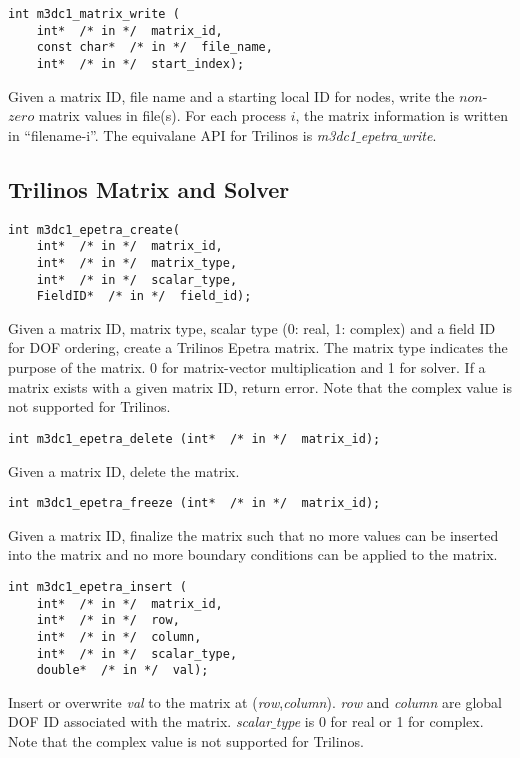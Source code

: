 \begin{verbatim}
int m3dc1_matrix_write (
    int*  /* in */  matrix_id, 
    const char*  /* in */  file_name, 
    int*  /* in */  start_index);
\end{verbatim}\vspace{-.5cm}\hspace{1cm}
Given a matrix ID, file name and a starting local ID for nodes, write the $non$-$zero$ matrix values in file(s). For each process $i$, the matrix information is written in ``filename-i''. The equivalane API for Trilinos is \textit{m3dc1$\_$epetra$\_$write}.

\subsection{Trilinos Matrix and Solver}
\begin{verbatim}
int m3dc1_epetra_create(
    int*  /* in */  matrix_id, 
    int*  /* in */  matrix_type, 
    int*  /* in */  scalar_type, 
    FieldID*  /* in */  field_id);
\end{verbatim}\vspace{-.5cm}\hspace{1cm}
Given a matrix ID, matrix type, scalar type (0: real, 1: complex) and a field ID for DOF ordering, create a Trilinos Epetra matrix. The matrix type indicates the purpose of the matrix. 0 for matrix-vector multiplication and 1 for solver. If a matrix exists with a given matrix ID, return error. Note that the complex value is not supported for Trilinos.

\begin{verbatim}
int m3dc1_epetra_delete (int*  /* in */  matrix_id);
\end{verbatim}\vspace{-.5cm}\hspace{1cm}
Given a matrix ID, delete the matrix. 

\begin{verbatim}
int m3dc1_epetra_freeze (int*  /* in */  matrix_id); 
\end{verbatim}\vspace{-.5cm}\hspace{1cm}
Given a matrix ID, finalize the matrix such that no more values can be inserted into the matrix and no more boundary conditions can be applied to the matrix.

\begin{verbatim}
int m3dc1_epetra_insert (
    int*  /* in */  matrix_id, 
    int*  /* in */  row, 
    int*  /* in */  column, 
    int*  /* in */  scalar_type, 
    double*  /* in */  val);
\end{verbatim}\vspace{-.5cm}\hspace{1cm}
Insert or overwrite \textit{val} to the matrix at (\textit{row},\textit{column}).
\textit{row} and \textit{column} are global DOF ID associated with the matrix.
\textit{scalar$\_$type} is 0 for real or 1 for complex. Note that the complex value is not supported for Trilinos.

